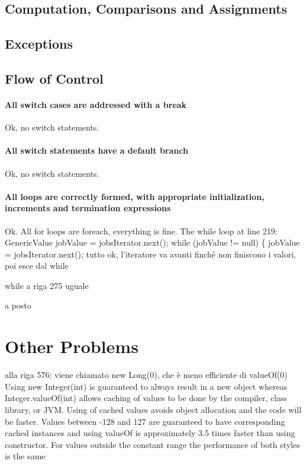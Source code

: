 \documentclass[english]{article}
\begin{document}
\subsection{Computation, Comparisons and Assignments}

\subsection{Exceptions}


\subsection{Flow of Control}
\paragraph{All switch cases are addressed with a break}
Ok, no switch statements.

\paragraph{All switch statements have a default branch}
Ok, no switch statements.

\paragraph{All loops are correctly formed, with appropriate initialization, increments and termination expressions}
Ok.
All for loops are foreach, everything is fine.
The while loop at line 219:
GenericValue jobValue = jobsIterator.next();
while (jobValue != null) \{
jobValue = jobsIterator.next();
tutto ok, l'iteratore va avanti finché non finiscono i valori, poi esce dal while

while a riga 275 uguale

a posto

\section{Other Problems} %
alla riga 576:
viene chiamato new Long(0), che è meno efficiente di valueOf(0)
Using new Integer(int) is guaranteed to always result in a new object whereas Integer.valueOf(int) allows caching of values to be done by the compiler, class library, or JVM. Using of cached values avoids object allocation and the code will be faster.
Values between -128 and 127 are guaranteed to have corresponding cached instances and using valueOf is approximately 3.5 times faster than using constructor. For values outside the constant range the performance of both styles is the same
\end{document}

